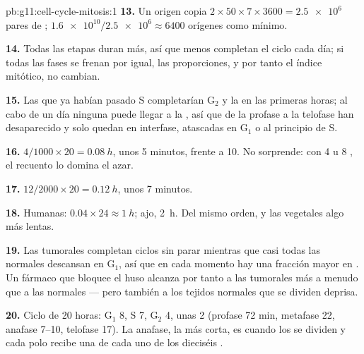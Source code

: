\begin{solution}{pb:g11:cell-cycle-mitosis:1}
\textbf{13.} Un origen copia $2 \times 50 \times 7 \times 3600 =
\num{2.5e6}$ pares de ; $\num{1.6e10}/\num{2.5e6} \approx 6400$
orígenes como mínimo.

\textbf{14.} Todas las etapas duran más, así que menos 
completan el ciclo cada día; si todas las fases se frenan por igual,
las proporciones, y por tanto el índice mitótico, no cambian.

\textbf{15.} Las  que ya habían pasado S completarían
$\mathrm{G_2}$ y la  en las primeras horas; al cabo de un día
ninguna  puede llegar a la , así que de la profase a la
telofase han desaparecido y solo quedan  en interfase,
atascadas en $\mathrm{G_1}$ o al principio de S.

\textbf{16.} $4/1000 \times 20 = \qty{0.08}{h}$, unos 5 minutos, frente
a 10. No sorprende: con 4 u 8 , el recuento lo domina el azar.

\textbf{17.} $12/2000 \times 20 = \qty{0.12}{h}$, unos 7 minutos.

\textbf{18.} Humanas: $0.04 \times 24 \approx \qty{1}{h}$; ajo,
\qty{2}{h}. Del mismo orden, y las  vegetales algo más lentas.

\textbf{19.} Las  tumorales completan ciclos sin parar mientras
que casi todas las normales descansan en $\mathrm{G_1}$, así que en
cada momento hay una fracción mayor en . Un fármaco que bloquee
el huso alcanza por tanto a las  tumorales más a menudo que a
las normales --- pero también a los tejidos normales que se dividen
deprisa.

\textbf{20.} Ciclo de 20 horas: $\mathrm{G_1}$ 8, S 7, $\mathrm{G_2}$
4,  unas 2 (profase 72 min, metafase 22, anafase 7--10, telofase
17). La anafase, la más corta, es cuando los  se dividen y
cada polo recibe una  de cada uno de los dieciséis .
\end{solution}
